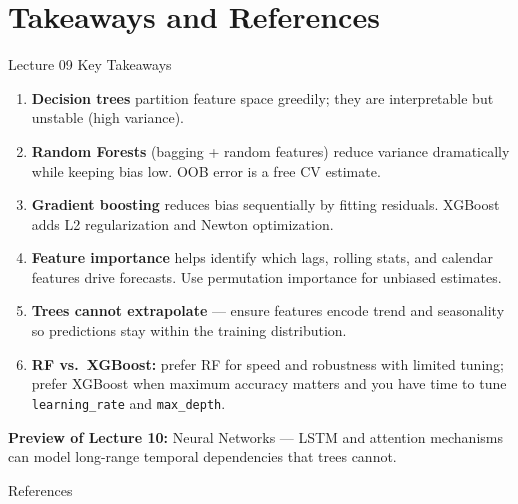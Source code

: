 \documentclass[aspectratio=169, 10pt]{beamer}
\begin{document}
\section{Takeaways and References}


\begin{frame}{Lecture 09 Key Takeaways}
  \begin{keybox}
    \begin{enumerate}
      \item \textbf{Decision trees} partition feature space greedily; they are
            interpretable but unstable (high variance).
      \item \textbf{Random Forests} (bagging + random features) reduce variance
            dramatically while keeping bias low. OOB error is a free CV estimate.
      \item \textbf{Gradient boosting} reduces bias sequentially by fitting
            residuals. XGBoost adds L2 regularization and Newton optimization.
      \item \textbf{Feature importance} helps identify which lags, rolling stats,
            and calendar features drive forecasts. Use permutation importance
            for unbiased estimates.
      \item \textbf{Trees cannot extrapolate} — ensure features encode trend and
            seasonality so predictions stay within the training distribution.
      \item \textbf{RF vs.\ XGBoost:} prefer RF for speed and robustness with
            limited tuning; prefer XGBoost when maximum accuracy matters and
            you have time to tune \texttt{learning\_rate} and \texttt{max\_depth}.
    \end{enumerate}
  \end{keybox}

  \medskip
  \textbf{Preview of Lecture 10:} Neural Networks — LSTM and attention mechanisms
  can model long-range temporal dependencies that trees cannot.
\end{frame}

\begin{frame}{References}
  \printbibliography[heading=none]
\end{frame}

\end{document}
